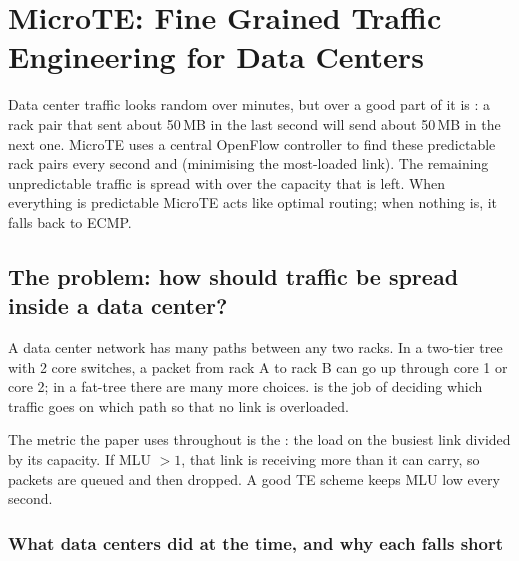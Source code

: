 \chapter{MicroTE: Fine Grained Traffic Engineering for Data Centers}

\begin{keybox}
Data center traffic looks random over minutes, but over  a good part of it is : a rack pair
that sent about 50\,MB in the last second will send about 50\,MB in the next one. MicroTE uses a central OpenFlow controller to
find these predictable rack pairs every second and  (minimising the most-loaded link). The
remaining unpredictable traffic is spread with  over the capacity that is left. When everything is
predictable MicroTE acts like optimal routing; when nothing is, it falls back to ECMP.
\end{keybox}

\section{The problem: how should traffic be spread inside a data center?}

A data center network has many paths between any two racks. In a two-tier tree with 2 core switches, a packet from rack A to
rack B can go up through core 1 or core 2; in a fat-tree there are many more choices.  is the job
of deciding which traffic goes on which path so that no link is overloaded.

The metric the paper uses throughout is the : the load on the busiest link divided by its
capacity. If MLU $> 1$, that link is receiving more than it can carry, so packets are queued and then dropped. A good TE scheme
keeps MLU low every second.


\subsection{What data centers did at the time, and why each falls short}

